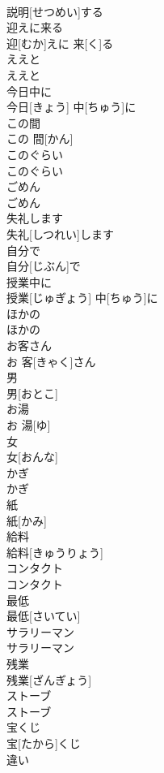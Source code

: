 \documentclass[8pt]{extreport}
\begin{document}
\begin{CJK}{UTF8}{min}
\\	説明[せつめい]する
\\	迎えに来る	
\\	迎[むか]えに 来[く]る
\\	ええと	
\\	ええと
\\	今日中に	
\\	今日[きょう] 中[ちゅう]に
\\	この間	
\\	この 間[かん]
\\	このぐらい	
\\	このぐらい
\\	ごめん	
\\	ごめん
\\	失礼します	
\\	失礼[しつれい]します
\\	自分で	
\\	自分[じぶん]で
\\	授業中に	
\\	授業[じゅぎょう] 中[ちゅう]に
\\	ほかの	
\\	ほかの
\\	お客さん	
\\	お 客[きゃく]さん
\\	男	
\\	男[おとこ]
\\	お湯	
\\	お 湯[ゆ]
\\	女	
\\	女[おんな]
\\	かぎ	
\\	かぎ
\\	紙	
\\	紙[かみ]
\\	給料	
\\	給料[きゅうりょう]
\\	コンタクト	
\\	コンタクト
\\	最低	
\\	最低[さいてい]
\\	サラリーマン	
\\	サラリーマン
\\	残業	
\\	残業[ざんぎょう]
\\	ストーブ	
\\	ストーブ
\\	宝くじ	
\\	宝[たから]くじ
\\	違い	

\end{CJK}
\end{document}
